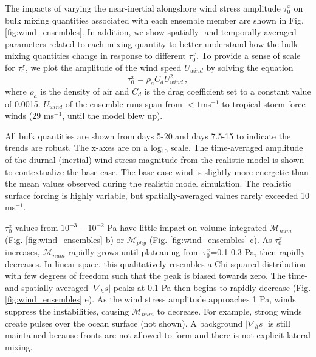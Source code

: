 The impacts of varying the near-inertial alongshore wind stress amplitude $\tau_0^x$ on bulk mixing quantities associated with each ensemble member are shown in Fig. \ref{fig:wind_ensembles}. In addition, we show spatially- and temporally averaged parameters related to each mixing quantity to better understand how the bulk mixing quantities change in response to different $\tau_0^x$. To provide a sense of scale for $\tau_0^x$, we plot the amplitude of the wind speed $U_{wind}$ by solving the equation
\begin{equation} \label{eqn:windspd}
    \tau_0^x=\rho_a C_d U_{wind}^2 \, ,
\end{equation}
where $\rho_a$ is the density of air and $C_d$ is the drag coefficient set to a constant value of 0.0015. $U_{wind}$ of the ensemble runs span from $<1$ms$^{-1}$ to tropical storm force winds (29 ms$^{-1}$, until the model blew up). 

All bulk quantities are shown from days 5-20 and days 7.5-15 to indicate the trends are robust. The x-axes are on a log$_{10}$ scale. The time-averaged amplitude of the diurnal (inertial) wind stress magnitude from the realistic model \citep[Fig. 7 a of ][]{Schlichting23} is shown to contextualize the base case. The base case wind is slightly more energetic than the mean values observed during the realistic model simulation. The realistic surface forcing is highly variable, but spatially-averaged values rarely exceeded 10 ms$^{-1}$. 

$\tau_0^x$ values from $10^{-3}-10^{-2}$ Pa have little impact on volume-integrated $\mathcal{M}_{num}$ (Fig. \ref{fig:wind_ensembles} b) or $\mathcal{M}_{phy}$ (Fig. \ref{fig:wind_ensembles} c). As $\tau_0^x$ increases, $\mathcal{M}_{num}$ rapidly grows until plateauing from $\tau_0^x$=0.1-0.3 Pa, then rapidly decreases. In linear space, this qualitatively resembles a Chi-squared distribution with few degrees of freedom such that the peak is biased towards zero. The time- and spatially-averaged $|\nabla_h s|$ peaks at 0.1 Pa then begins to rapidly decrease (Fig. \ref{fig:wind_ensembles} e). As the wind stress amplitude approaches 1 Pa, winds suppress the instabilities, causing $\mathcal{M}_{num}$ to decrease. For example, strong winds create pulses over the ocean surface (not shown). A background $|\nabla_h s|$ is still maintained because fronts are not allowed to form and there is not explicit lateral mixing. 

